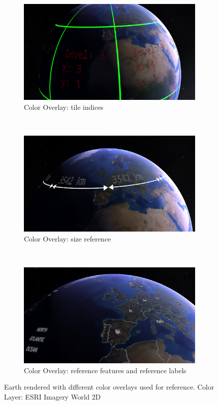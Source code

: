 \begin{figure}[h]
    \centering
    \begin{subfigure}[bt]{0.45\textwidth}
        \includegraphics[width=\textwidth]{figures/results/screenshots/coloroverlay1.jpg}
        \caption{Color Overlay: tile indices}
    \end{subfigure}
    ~
    \begin{subfigure}[bt]{0.45\textwidth}
        \includegraphics[width=\textwidth]{figures/results/screenshots/coloroverlay2.jpg}
        \caption{Color Overlay: size reference}
    \end{subfigure}
    ~
    \begin{subfigure}[bt]{0.90\textwidth}
        \includegraphics[width=\textwidth]{figures/results/screenshots/coloroverlay3.jpg}
        \caption{Color Overlay: reference features and reference labels \cite{gibs}}
    \end{subfigure}
    \caption{Earth rendered with different color overlays used for reference. Color Layer: ESRI Imagery World 2D \cite{imageryworld2d}}
    \label{fig:coloroverlays}
\end{figure}

